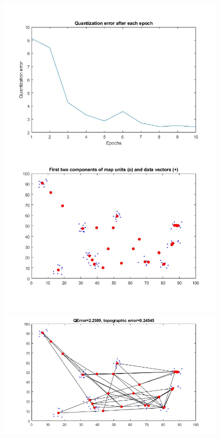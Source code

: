 \documentclass[11pt]{article}
\begin{document}
\begin{figure}[h!]
  \includegraphics{screeny/WTM_batch/WTM_batch_10_groups/WTM_batch_learning_process.jpg}
  \includegraphics{screeny/WTM_batch/WTM_batch_10_groups/WTM_batch_Graph.jpg}

\end{figure}
\end{document}
